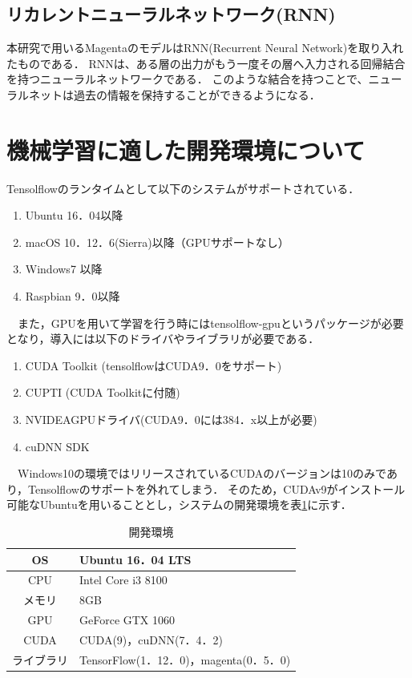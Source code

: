 \subsection{リカレントニューラルネットワーク(RNN)}
本研究で用いるMagentaのモデルはRNN(Recurrent Neural Network)を取り入れたものである．
RNNは、ある層の出力がもう一度その層へ入力される回帰結合を持つニューラルネットワークである．
このような結合を持つことで、ニューラルネットは過去の情報を保持することができるようになる．
\newpage
\section{機械学習に適した開発環境について}
Tensolflowのランタイムとして以下のシステムがサポートされている．\cite{webpage8}
\begin{enumerate}
    \renewcommand{\labelenumi}{(\arabic{enumi})}
    \item Ubuntu 16．04以降
    \item macOS 10．12．6(Sierra)以降（GPUサポートなし）
    \item Windows7 以降
    \item Raspbian 9．0以降
\end{enumerate}
　また，GPUを用いて学習を行う時にはtensolflow-gpuというパッケージが必要となり，導入には以下のドライバやライブラリが必要である．\cite{webpage7}
\begin{enumerate}
    \renewcommand{\labelenumi}{(\arabic{enumi})}
    \item CUDA Toolkit (tensolflowはCUDA9．0をサポート)
    \item CUPTI (CUDA Toolkitに付随)
    \item NVIDEAGPUドライバ(CUDA9．0には384．x以上が必要)
    \item cuDNN SDK
\end{enumerate}
　Windows10の環境ではリリースされているCUDAのバージョンは10のみであり，Tensolflowのサポートを外れてしまう．
そのため，CUDAv9がインストール可能なUbuntuを用いることとし，システムの開発環境を表\ref{tab:開発環境}に示す．
\begin{table}[h]
\begin{center}
\caption{開発環境}
\label{tab:開発環境}
\begin{tabular}{|c|p{}|}
\hline
    OS & Ubuntu 16．04 LTS\\
    \hline
    CPU & Intel Core i3 8100\\
    \hline
    メモリ & 8GB\\
    \hline
    GPU & GeForce GTX 1060\\
    \hline
    CUDA & CUDA(9)，cuDNN(7．4．2)\\
    \hline
    ライブラリ & TensorFlow(1．12．0)，magenta(0．5．0)\\
    \hline
\end{tabular}
\end{center}
\end{table}\\
\newpage
